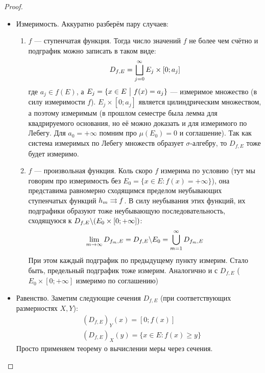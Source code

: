 \begin{proof}~
	\begin{itemize}
		\item Измеримость. Аккуратно разберём пару случаев:
		\begin{enumerate}
			\item $f$ --- ступенчатая функция. Тогда число значений $f$ не более чем счётно и подграфик можно записать в таком виде:
			\[
			D_{f, E} = \bigsqcup_{j = 0}^\infty E_j \times [0; a_j]
			\]
			где $a_j \in f(E)$, а $E_j = \{x \in E \ \big|\  f(x) = a_j\}$ --- измеримое множество (в силу измеримости $f$). $E_j \times [0; a_j]$ является цилиндрическим множеством, а поэтому измеримым (в прошлом семестре была лемма для квадрируемого основания, но её можно доказать и для измеримого по Лебегу. Для $a_0 = +\infty$ помним про $\mu(E_0) = 0$ и соглашение). Так как система измеримых по Лебегу множеств образует $\sigma$-алгебру, то $D_{f, E}$ тоже будет измеримо.
			
			\item $f$ --- произвольная функция. Коль скоро $f$ измерима по условию (тут мы говорим про измеримость без $E_0 = \{x \in E \colon f(x) = +\infty\}$), она представима равномерно сходящимся пределом неубывающих ступенчатых функций $h_m \rightrightarrows f$. В силу неубывания этих функций, их подграфики образуют тоже неубывающую последовательность, сходящуюся к $D_{f, E} \backslash (E_0 \times [0; +\infty])$:
			\[
				\lim_{m \to \infty} D_{f_m, E} = D_{f, E} \backslash E_0 = \bigcup_{m = 1}^\infty D_{f_m, E}
			\]
			При этом каждый подграфик по предыдущему пункту измерим. Стало быть, предельный подграфик тоже измерим. Аналогично и с $D_{f, E}$ ($E_0 \times [0; +\infty]$ измеримо по соглашению)
		\end{enumerate}
	
		\item Равенство. Заметим следующие сечения $D_{f, E}$ (при соответствующих размерностях $X, Y$):
		\begin{align*}
			&{(D_{f, E})_Y(x) = [0; f(x)]}
			\\
			&{(D_{f, E})_X(y) = \{x \in E \colon f(x) \ge y\}}
		\end{align*}
		Просто применяем теорему о вычислении меры через сечения.
	\end{itemize}
\end{proof}


